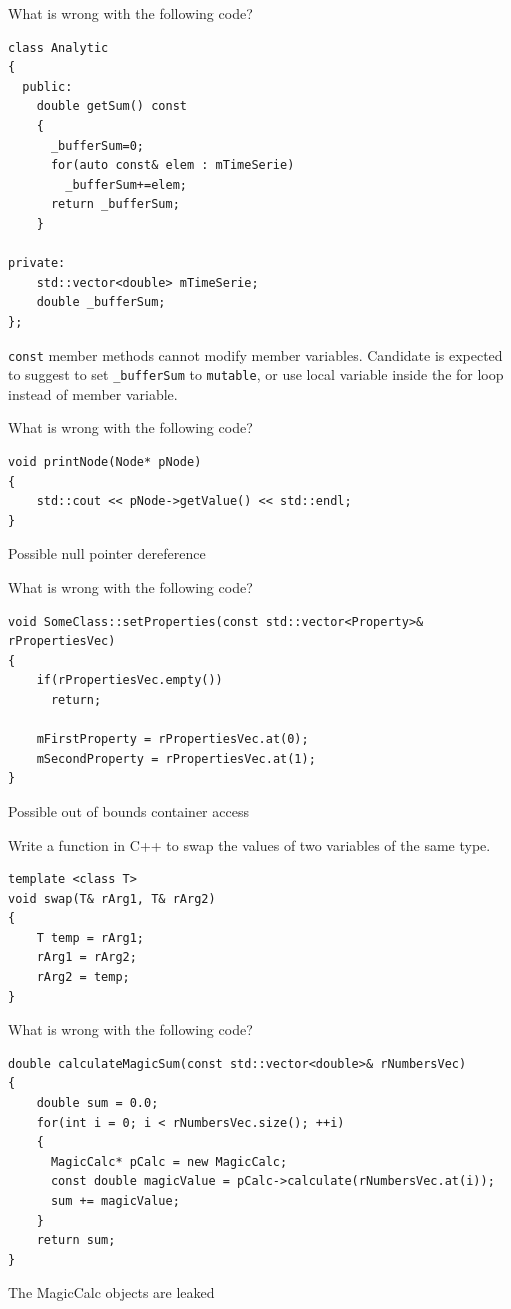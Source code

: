 \documentclass[answers]{exam}
\begin{document}
\begin{questions}
\question What is wrong with the following code?
\begin{lstlisting}
class Analytic
{
  public:
    double getSum() const
    {
      _bufferSum=0;
      for(auto const& elem : mTimeSerie)
        _bufferSum+=elem;
      return _bufferSum;
    }

private:
    std::vector<double> mTimeSerie;
    double _bufferSum;
};

\end{lstlisting}
\begin{solution}[.2in]
\lstinline{const} member methods cannot modify member variables. Candidate is expected to suggest to set \lstinline{_bufferSum} to \lstinline{mutable}, or use local variable inside the for loop instead of member variable.
\end{solution}

\question What is wrong with the following code?
\begin{lstlisting}
void printNode(Node* pNode)
{
    std::cout << pNode->getValue() << std::endl;
}
\end{lstlisting}
\begin{solution}[.2in]
Possible null pointer dereference
\end{solution}

\question What is wrong with the following code?
\begin{lstlisting}
void SomeClass::setProperties(const std::vector<Property>& rPropertiesVec)
{
    if(rPropertiesVec.empty())
      return;

    mFirstProperty = rPropertiesVec.at(0);
    mSecondProperty = rPropertiesVec.at(1);
}
\end{lstlisting}
\begin{solution}[.2in]
Possible out of bounds container access
\end{solution}

\question Write a function in C++ to swap the values of two variables of the same type.
\begin{solution}[.2in]
\begin{lstlisting}
template <class T>
void swap(T& rArg1, T& rArg2)
{
    T temp = rArg1;
    rArg1 = rArg2;
    rArg2 = temp;
}
\end{lstlisting}
\end{solution}

\question What is wrong with the following code?
\begin{lstlisting}
double calculateMagicSum(const std::vector<double>& rNumbersVec)
{
    double sum = 0.0;
    for(int i = 0; i < rNumbersVec.size(); ++i)
    {
      MagicCalc* pCalc = new MagicCalc;
      const double magicValue = pCalc->calculate(rNumbersVec.at(i));
      sum += magicValue;
    }
    return sum;
}
\end{lstlisting}
\begin{solution}[.2in]
The MagicCalc objects are leaked
\end{solution}


\end{questions}
\end{document}
